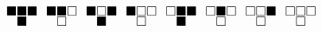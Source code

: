 \documentclass[11pt]{article}
\begin{document}
\[ \LARGE
\substack{\blacksquare \blacksquare \blacksquare \\ \blacksquare} \enspace
\substack{\blacksquare \blacksquare \square \\ \square} \enspace
\substack{\blacksquare \square \blacksquare \\ \blacksquare } \enspace
\substack{\blacksquare \square \square \\ \square} \enspace
\substack{\square \blacksquare \blacksquare \\ \blacksquare} \enspace
\substack{\square \blacksquare \square \\ \square} \enspace
\substack{\square \square \blacksquare \\ \square} \enspace
\substack{\square \square \square \\ \square}
\]
\end{document}
